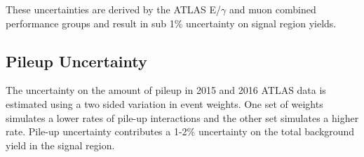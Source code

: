 \indent These uncertainties are derived by the ATLAS E/$\gamma$ and muon combined performance groups and result in sub 1\% uncertainty on signal region yields.\cite{MuonReco,EleID} \\

\subsection{Pileup Uncertainty}

\indent The uncertainty on the amount of pileup in 2015 and 2016 ATLAS data is estimated using a two sided variation in event weights.  One set of weights simulates a lower rates of pile-up interactions and the other set simulates a higher rate.  Pile-up uncertainty contributes a 1-2\% uncertainty on the total background yield in the signal region.







